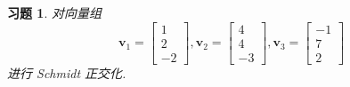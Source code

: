 \documentclass[UTF8]{ctexart}
\newtheorem{ex}[thm]{习题}
\begin{document}
\begin{ex}
  对向量组
  \begin{equation*}
    \boldsymbol{v}_1 =
    \begin{bmatrix}
      1 \\ 2 \\ -2
    \end{bmatrix},
    \boldsymbol{v}_2 =
    \begin{bmatrix}
      4 \\ 4 \\-3
    \end{bmatrix},
    \boldsymbol{v}_3 =
    \begin{bmatrix}
      -1 \\ 7 \\ 2
    \end{bmatrix}
  \end{equation*}
  进行 Schmidt 正交化.
\end{ex}
\end{document}
